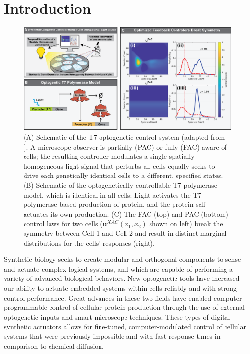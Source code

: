 \documentclass[12pt]{article}
\begin{document}
\section{Introduction}
\begin{figure}
\begin{center}
\includegraphics[width=\columnwidth]{CartoonAndControler.png}
\caption{(A) Schematic of the T7 optogenetic control system (adapted from \cite{May2021}). A microscope observer is partially (PAC) or fully (FAC) aware  of cells; the resulting controller modulates a single spatially homogeneous light signal that perturbs all cells equally seeks to drive each genetically identical cells to a different, specified states. (B) Schematic of the optogenetically controllable T7 polymerase model, which is identical in all cells: Light activates the T7 polymerase-based production of protein, and the protein self-actuates its own production. (C) The FAC (top) and PAC (bottom) control laws for two cells ($\mathbf{u}^{XAC}(x_1,x_2)$ shown on left) break the symmetry between Cell 1 and Cell 2 and result in distinct marginal distributions for the cells' responses (right).}
\label{cartoons}
\end{center}
\vspace{-0.3in}
\end{figure}


Synthetic biology seeks to create modular\cite{Ng2019} and orthogonal\cite{Liu2018} components to sense and actuate\cite{Sheets2020} complex logical systems\cite{Groseclose2020}, and which are capable of performing a variety of advanced biological behaviors\cite{Shin2020}. New optogenetic tools have increased our ability to actuate embedded systems within cells reliably and with strong control performance\cite{Sheets2020,Baumschlager2017,Chen2020,Lillacci2018}. Great advances in these two fields have enabled computer programmable control of cellular protein production through the use of external optogenetic inputs and smart microscope techniques\cite{Fox2021,Baumschlager2021,Lugagne2017}. These types of digital-synthetic actuators allows for fine-tuned, computer-modulated control of cellular systems that were previously impossible\cite{Rullan2018, Baumschlager2017} and with fast response times in comparison to chemical diffusion. 
\end{document}
